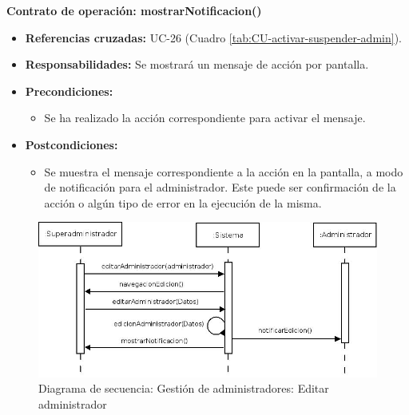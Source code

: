 \textbf{Contrato de operación: mostrarNotificacion()}
\begin{itemize}
\item \textbf{Referencias cruzadas:} UC-26 (Cuadro \ref{tab:CU-activar-suspender-admin}).
\item \textbf{Responsabilidades:} Se mostrará un mensaje de acción por pantalla.
\item \textbf{Precondiciones:} 
 \begin{itemize}
\item Se ha realizado la acción correspondiente para activar el mensaje.
\end {itemize}
\item \textbf{Postcondiciones:} 
 \begin{itemize}
\item Se muestra el mensaje correspondiente a la acción en la pantalla, a modo de notificación para el administrador. Este puede ser confirmación de la acción o algún tipo de error en la ejecución de la misma.
\end {itemize}
\end {itemize}


\vspace{10mm}

\begin{figure}[H]
\centering
  \includegraphics[scale=.50]{img/secuencias/gestion-administradores-editar-administrador.jpeg}
  \caption{Diagrama de secuencia: Gestión de administradores: Editar administrador}
  \label{fig:secuencia-gestion-administradores-editar-administrador}
\end{figure}

